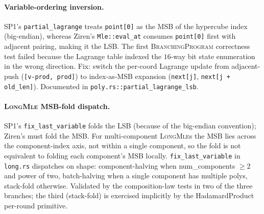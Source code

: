 \paragraph{Variable-ordering inversion.}  SP1's
\texttt{partial\_lagrange} treats \texttt{point[0]} as the MSB of
the hypercube index (big-endian), whereas Ziren's
\texttt{Mle::eval\_at} consumes \texttt{point[0]} first with
adjacent pairing, making it the LSB.  The first
\textsc{BranchingProgram} correctness test failed because the
Lagrange table indexed the $16$-way bit state enumeration in the
wrong direction.  Fix: switch the per-coord Lagrange update from
adjacent-push (\texttt{[v-prod, prod]}) to index-as-MSB expansion
(\texttt{next[j]}, \texttt{next[j + old\_len]}).  Documented in
\texttt{poly.rs::partial\_lagrange\_lsb}.

\paragraph{\textsc{LongMle} MSB-fold dispatch.}  SP1's
\texttt{fix\_last\_variable} folds the LSB (because of the
big-endian convention); Ziren's must fold the MSB.  For
multi-component \textsc{LongMle}s the MSB lies across the
component-index axis, not within a single component, so the fold
is not equivalent to folding each component's MSB locally.
\texttt{fix\_last\_variable} in \texttt{long.rs} dispatches on
shape: component-halving when num\_components $\ge 2$ and power of
two, batch-halving when a single component has multiple polys,
stack-fold otherwise.  Validated by the composition-law tests in
two of the three branches; the third (stack-fold) is exercised
implicitly by the HadamardProduct per-round primitive.
